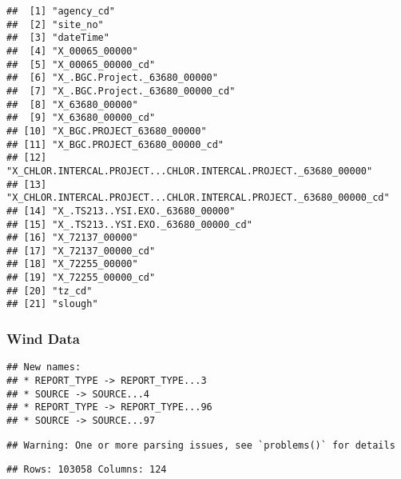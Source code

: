 \documentclass[
]{article}
\begin{document}
\begin{verbatim}
##  [1] "agency_cd"                                                        
##  [2] "site_no"                                                          
##  [3] "dateTime"                                                         
##  [4] "X_00065_00000"                                                    
##  [5] "X_00065_00000_cd"                                                 
##  [6] "X_.BGC.Project._63680_00000"                                      
##  [7] "X_.BGC.Project._63680_00000_cd"                                   
##  [8] "X_63680_00000"                                                    
##  [9] "X_63680_00000_cd"                                                 
## [10] "X_BGC.PROJECT_63680_00000"                                        
## [11] "X_BGC.PROJECT_63680_00000_cd"                                     
## [12] "X_CHLOR.INTERCAL.PROJECT...CHLOR.INTERCAL.PROJECT._63680_00000"   
## [13] "X_CHLOR.INTERCAL.PROJECT...CHLOR.INTERCAL.PROJECT._63680_00000_cd"
## [14] "X_.TS213..YSI.EXO._63680_00000"                                   
## [15] "X_.TS213..YSI.EXO._63680_00000_cd"                                
## [16] "X_72137_00000"                                                    
## [17] "X_72137_00000_cd"                                                 
## [18] "X_72255_00000"                                                    
## [19] "X_72255_00000_cd"                                                 
## [20] "tz_cd"                                                            
## [21] "slough"
\end{verbatim}

\hypertarget{wind-data}{%
\subsubsection{Wind Data}\label{wind-data}}

\begin{verbatim}
## New names:
## * REPORT_TYPE -> REPORT_TYPE...3
## * SOURCE -> SOURCE...4
## * REPORT_TYPE -> REPORT_TYPE...96
## * SOURCE -> SOURCE...97
\end{verbatim}

\begin{verbatim}
## Warning: One or more parsing issues, see `problems()` for details
\end{verbatim}

\begin{verbatim}
## Rows: 103058 Columns: 124
\end{verbatim}
\end{document}

